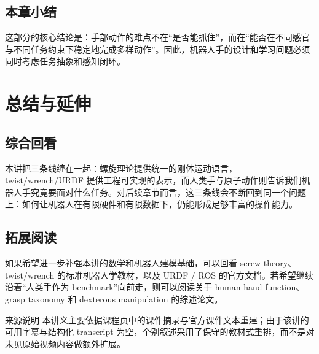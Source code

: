 \documentclass[a4paper]{article}
\begin{document}
\subsection{本章小结}
这部分的核心结论是：手部动作的难点不在“是否能抓住”，而在“能否在不同感官与不同任务约束下稳定地完成多样动作”。因此，机器人手的设计和学习问题必须同时考虑任务抽象和感知闭环。

\section{总结与延伸}

\subsection{综合回看}
本讲把三条线缠在一起：螺旋理论提供统一的刚体运动语言，twist/wrench/URDF 提供工程可实现的表示，而人类手与原子动作则告诉我们机器人手究竟要面对什么任务。对后续章节而言，这三条线会不断回到同一个问题上：如何让机器人在有限硬件和有限数据下，仍能形成足够丰富的操作能力。

\subsection{拓展阅读}
如果希望进一步补强本讲的数学和机器人建模基础，可以回看 screw theory、twist/wrench 的标准机器人学教材，以及 URDF / ROS 的官方文档。若希望继续沿着“人类手作为 benchmark”向前走，则可以阅读关于 human hand function、grasp taxonomy 和 dexterous manipulation 的综述论文。

\begin{warningbox}{来源说明}
本讲义主要依据课程页中的课件摘录与官方课件文本重建；由于该讲的可用字幕与结构化 transcript 为空，个别叙述采用了保守的教材式重排，而不是对未见原始视频内容做额外扩展。
\end{warningbox}
\end{document}
